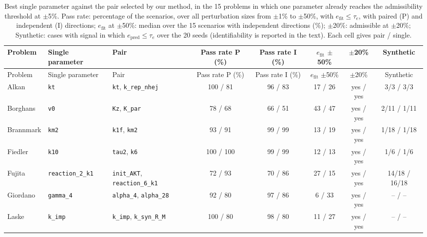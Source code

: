 \begin{longtable}{@{}>{\raggedright\arraybackslash}p{1.7cm}>{\raggedright\arraybackslash}p{2.6cm}>{\raggedright\arraybackslash}p{3.0cm}ccccc@{}}
\caption{Best single parameter against the pair selected by our method, in the 15 problems in which one parameter already reaches the admissibility threshold at $\pm$5\%. Pass rate: percentage of the scenarios, over all perturbation sizes from $\pm$1\% to $\pm$50\%, with $e_{\mathrm{fit}}\le\tau_e$, with paired (P) and independent (I) directions; $e_{\mathrm{fit}}$ at $\pm$50\%: median over the 15 scenarios with independent directions (\%); $\pm$20\%: admissible at $\pm$20\%; Synthetic: cases with signal in which $e_{\mathrm{pred}}\le\tau_e$ over the 20 seeds (identifiability is reported in the text). Each cell gives pair / single.}\label{tab:kmin}\\
\toprule
Problem & Single parameter & Pair & Pass rate P (\%) & Pass rate I (\%) & $e_{\mathrm{fit}}$ $\pm$50\% & $\pm$20\% & Synthetic \\
\midrule
\endfirsthead
\toprule
Problem & Single parameter & Pair & Pass rate P (\%) & Pass rate I (\%) & $e_{\mathrm{fit}}$ $\pm$50\% & $\pm$20\% & Synthetic \\
\midrule
\endhead
Alkan & \texttt{kt} & \texttt{kt}, \texttt{k\_\allowbreak{}rep\_\allowbreak{}nhej} & 100 / 81 & 96 / 83 & 17 / 26 & yes / yes & 3/3 / 3/3 \\
Borghans & \texttt{v0} & \texttt{Kz}, \texttt{K\_\allowbreak{}par} & 78 / 68 & 66 / 51 & 43 / 47 & yes / yes & 2/11 / 1/11 \\
Brannmark & \texttt{km2} & \texttt{k1f}, \texttt{km2} & 93 / 91 & 99 / 99 & 13 / 19 & yes / yes & 1/18 / 1/18 \\
Fiedler & \texttt{k10} & \texttt{tau2}, \texttt{k6} & 100 / 100 & 99 / 99 & 12 / 13 & yes / yes & 1/6 / 1/6 \\
Fujita & \texttt{reaction\_\allowbreak{}2\_\allowbreak{}k1} & \texttt{init\_\allowbreak{}AKT}, \texttt{reaction\_\allowbreak{}6\_\allowbreak{}k1} & 72 / 93 & 70 / 86 & 27 / 15 & yes / yes & 14/18 / 16/18 \\
Giordano & \texttt{gamma\_\allowbreak{}4} & \texttt{alpha\_\allowbreak{}4}, \texttt{alpha\_\allowbreak{}28} & 92 / 80 & 97 / 86 & 6 / 33 & yes / yes & -- / -- \\
Laske & \texttt{k\_\allowbreak{}imp} & \texttt{k\_\allowbreak{}imp}, \texttt{k\_\allowbreak{}syn\_\allowbreak{}R\_\allowbreak{}M} & 100 / 80 & 98 / 80 & 11 / 27 & yes / yes & -- / -- \\

\end{longtable}
